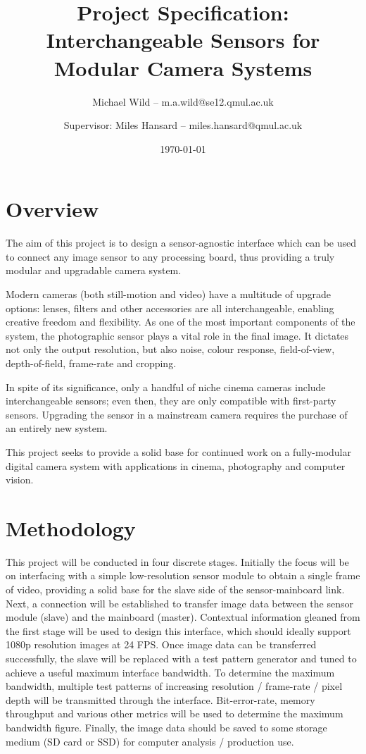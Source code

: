 \documentclass[a4paper]{article}
\title{Project Specification: Interchangeable Sensors for Modular Camera Systems}
\author{Michael Wild – m.a.wild@se12.qmul.ac.uk \and Supervisor: Miles Hansard – miles.hansard@qmul.ac.uk}
\date{\today}
\begin{document}
\maketitle

\section{Overview}

The aim of this project is to design a sensor-agnostic interface which can be used to connect any image sensor to any processing board, thus providing a truly modular and upgradable camera system.

Modern cameras (both still-motion and video) have a multitude of upgrade options: lenses, filters and other accessories are all interchangeable, enabling creative freedom and flexibility. As one of the most important components of the system, the photographic sensor plays a vital role in the final image. It dictates not only the output resolution, but also noise, colour response, field-of-view, depth-of-field, frame-rate and cropping. 

In spite of its significance, only a handful of niche cinema cameras include interchangeable sensors; even then, they are only compatible with first-party sensors. Upgrading the sensor in a mainstream camera requires the purchase of an entirely new system.

This project seeks to provide a solid base for continued work on a fully-modular digital camera system with applications in cinema, photography and computer vision.

\section{Methodology}

This project will be conducted in four discrete stages. Initially the focus will be on interfacing with a simple low-resolution sensor module to obtain a single frame of video, providing a solid base for the slave side of the sensor-mainboard link. Next, a connection will be established to transfer image data between the sensor module (slave) and the mainboard (master). Contextual information gleaned from the first stage will be used to design this interface, which should ideally support 1080p resolution images at 24 FPS. Once image data can be transferred successfully, the slave will be replaced with a test pattern generator and tuned to achieve a useful maximum interface bandwidth. To determine the maximum bandwidth, multiple test patterns of increasing resolution / frame-rate / pixel depth will be transmitted through the interface. Bit-error-rate, memory throughput and various other metrics will be used to determine the maximum bandwidth figure. Finally, the image data should be saved to some storage medium (SD card or SSD) for computer analysis / production use.
\end{document}
